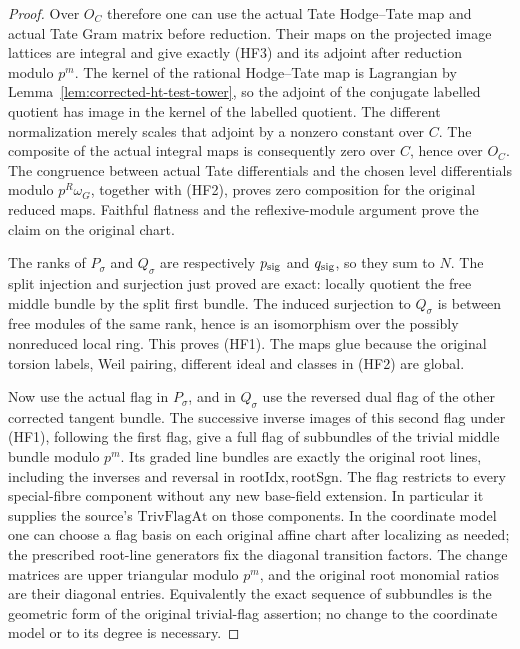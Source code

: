 \begin{proof}
Over \(O_C\) therefore one can use the actual Tate Hodge--Tate
map and actual Tate Gram matrix before reduction. Their maps
on the projected image lattices are integral and give exactly
(HF3) and its adjoint after reduction modulo \(p^m\).
The kernel of the rational Hodge--Tate map is Lagrangian by
Lemma~\ref{lem:corrected-ht-test-tower}, so the adjoint of the
conjugate labelled quotient has image in the kernel of the
labelled quotient. The different normalization merely scales
that adjoint by a nonzero constant over \(C\).
The composite of the actual integral maps is consequently zero
over \(C\), hence over \(O_C\). The congruence between actual
Tate differentials and the chosen level differentials modulo
\(p^R\omega_G\), together with (HF2), proves zero composition
for the original reduced maps. Faithful flatness and the
reflexive-module argument prove the claim on the original chart.

The ranks of \(P_\sigma\) and \(Q_\sigma\) are respectively
\(p_{\rm sig}\) and \(q_{\rm sig}\), so they sum to \(N\).
The split injection and surjection just proved are exact:
locally quotient the free middle bundle by the split first
bundle. The induced surjection to \(Q_\sigma\) is between free
modules of the same rank, hence is an isomorphism over the
possibly nonreduced local ring. This proves (HF1).
The maps glue because the original torsion labels, Weil pairing,
different ideal and classes in (HF2) are global.

Now use the actual flag in \(P_\sigma\), and in \(Q_\sigma\)
use the reversed dual flag of the other corrected tangent bundle.
The successive inverse images of this second flag under (HF1),
following the first flag, give a full flag of subbundles of the
trivial middle bundle modulo \(p^m\). Its graded line bundles are
exactly the original root lines, including the inverses and reversal
in \(\mathrm{rootIdx},\mathrm{rootSgn}\). The flag restricts to every
special-fibre component without any new base-field extension.
In particular it supplies the source's \(\mathrm{TrivFlagAt}\)
on those components. In the coordinate model one can choose a flag
basis on each original affine chart after localizing as needed;
the prescribed root-line generators fix the diagonal transition
factors. The change matrices are upper triangular modulo \(p^m\),
and the original root monomial ratios are their diagonal entries.
Equivalently the exact sequence of subbundles is the geometric
form of the original trivial-flag assertion; no change to the
coordinate model or to its degree is necessary.


\end{proof}
